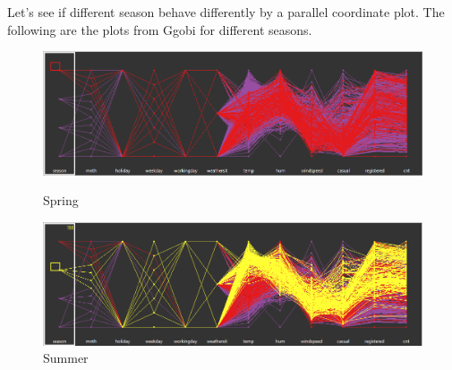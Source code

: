 \documentclass[12pt]{article}
\begin{document}
	 Let's see if different season behave differently by a parallel coordinate plot. The following are the plots from Ggobi for different seasons.
	 
	 \begin{figure}[H]
	 	\centering
	 	\begin{minipage}{.5\textwidth}
	 		\centering
	 		\includegraphics[width=\linewidth]{figures/spring_pcor.png}
	 		\caption{Spring}
	 	\end{minipage}%
	 	\begin{minipage}{.5\textwidth}
	 		\centering
	 		\includegraphics[width=\linewidth]{figures/summer_pcor.png}
	 		\caption{Summer}
	 	\end{minipage}
	 \end{figure}
	 
\end{document}
